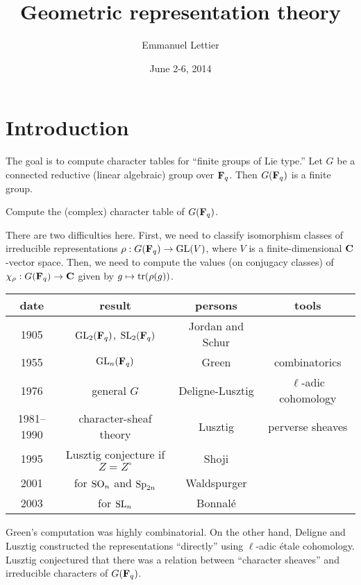 \documentclass{article}
\title{Geometric representation theory}
\author{Emmanuel Lettier}
\date{June 2-6, 2014}
\begin{document}
\maketitle
\tableofcontents





\section*{Introduction}

The goal is to compute character tables for ``finite groups of Lie type.'' Let 
$G$ be a connected reductive (linear algebraic) group over $\mathbf{F}_q$. Then 
$G(\mathbf{F}_q)$ is a finite group. 

\begin{problem}
Compute the (complex) character table of $G(\mathbf{F}_q)$. 
\end{problem}

There are two difficulties here. First, we need to classify isomorphism classes 
of irreducible representations $\rho:G(\mathbf{F}_q) \to \operatorname{GL}(V)$, where $V$ 
is a finite-dimensional $\mathbf{C}$-vector space. Then, we need to compute the values 
(on conjugacy classes) of $\chi_\rho:G(\mathbf{F}_q) \to \mathbf{C}$ given by 
$g\mapsto \operatorname{tr}(\rho(g))$. 
\begin{center}
\begin{tabular}{cccc}
date & result & persons & tools \\ \hline
1905 & $\operatorname{GL}_2(\mathbf{F}_q)$, $\operatorname{SL}_2(\mathbf{F}_q)$ & Jordan and Schur \\
1955 & $\operatorname{GL}_n(\mathbf{F}_q)$ & Green & combinatorics \\
1976 & general $G$ & Deligne-Lusztig & $\ell$-adic cohomology \\
1981--1990 & character-sheaf theory & Lusztig & perverse sheaves \\
1995 & Lusztig conjecture if $Z=Z^\circ$ & Shoji \\
2001 & for $\operatorname{SO}_n$ and $\operatorname{Sp}_{2 n}$ & Waldspurger \\
2003 & for $\operatorname{SL}_n$ & Bonnal\'e 
\end{tabular}
\end{center}
Green's computation was highly combinatorial. On the other hand, Deligne and 
Lusztig constructed the representations ``directly'' using $\ell$-adic 
\'etale cohomology. Lusztig conjectured that there was a relation between 
``character sheaves'' and irreducible characters of $G(\mathbf{F}_q)$. 
\end{document}
